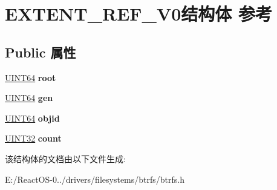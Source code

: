 \hypertarget{struct_e_x_t_e_n_t___r_e_f___v0}{}\section{E\+X\+T\+E\+N\+T\+\_\+\+R\+E\+F\+\_\+\+V0结构体 参考}
\label{struct_e_x_t_e_n_t___r_e_f___v0}
\subsection*{Public 属性}
\begin{DoxyCompactItemize}
\item 
\mbox{\label{struct_e_x_t_e_n_t___r_e_f___v0_a999d042e0995875b70444c4e3244e7bb}} 
\hyperlink{_processor_bind_8h_a57be03562867144161c1bfee95ca8f7c}{U\+I\+N\+T64} {\bfseries root}
\item 
\mbox{\label{struct_e_x_t_e_n_t___r_e_f___v0_a0cd1468b6fd8a443fa67dc5a51256cc8}} 
\hyperlink{_processor_bind_8h_a57be03562867144161c1bfee95ca8f7c}{U\+I\+N\+T64} {\bfseries gen}
\item 
\mbox{\label{struct_e_x_t_e_n_t___r_e_f___v0_abc7c7f23606154dc27c42f5f1435bba0}} 
\hyperlink{_processor_bind_8h_a57be03562867144161c1bfee95ca8f7c}{U\+I\+N\+T64} {\bfseries objid}
\item 
\mbox{\label{struct_e_x_t_e_n_t___r_e_f___v0_a43695436e4374adce8bc47c51dee9a6f}} 
\hyperlink{_processor_bind_8h_ae1e6edbbc26d6fbc71a90190d0266018}{U\+I\+N\+T32} {\bfseries count}
\end{DoxyCompactItemize}


该结构体的文档由以下文件生成\+:\begin{DoxyCompactItemize}
\item 
E\+:/\+React\+O\+S-\/0../drivers/filesystems/btrfs/btrfs.\+h\end{DoxyCompactItemize}
